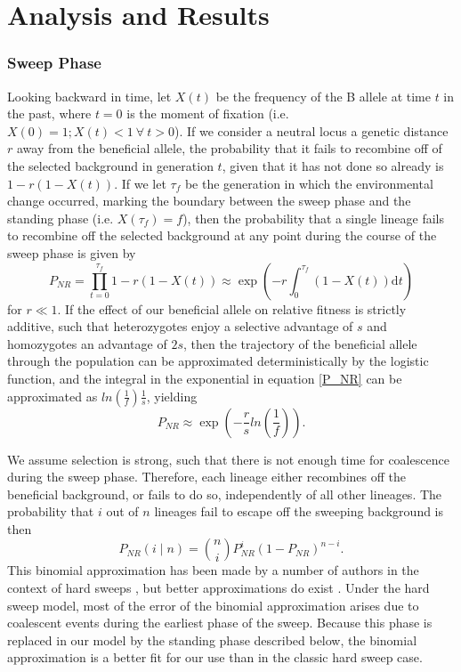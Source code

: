 \documentclass[a4paper,10pt]{article}
\begin{document}
\section*{Analysis and Results}

\subsubsection*{Sweep Phase}

Looking backward in time, let $X\left(t\right)$ be the frequency of the B allele at time $t$ in the past, where $t=0$ is the moment of fixation (i.e. $X\left(0\right) = 1; X\left(t\right) < 1\ \forall\ t > 0$). If we consider a neutral locus a genetic distance $r$ away from the beneficial allele, the probability that it fails to recombine off of the selected background in generation $t$, given that it has not done so already is $1-r\left(1-X(t)\right)$. If we let $\tau_{f}$ be the generation in which the environmental change occurred, marking the boundary between the sweep phase and the standing phase (i.e. $X\left(\tau_{f}\right) = f$), then the probability that a single lineage fails to recombine off the selected background at any point during the course of the sweep phase is given by
\begin{equation}
P_{NR} = \prod_{t=0}^{\tau_{f}} 1-r\left(1-X(t)\right)  \approx \exp \left(-r \int_0^{\tau_{f}}(1-X\left(t\right))\mathrm{d} t \right) \label{P_NR}
\end{equation}
for $r \ll 1$. If the effect of our beneficial allele on relative fitness is strictly additive, such that heterozygotes enjoy a selective advantage of $s$ and homozygotes an advantage of $2s$, then the trajectory of the beneficial allele through the population can be approximated deterministically by the logistic function, and the integral in the exponential in equation \eqref{P_NR} can be approximated as $ln\left(\frac{1}{f}\right) \frac{1}{s}$, yielding
\begin{equation}
	P_{NR} \approx \exp \left(-\frac{r}{s}ln\left(\frac{1}{f}\right)\right).
\end{equation}

We assume selection is strong, such that there is not enough time for coalescence during the sweep phase. Therefore, each lineage either recombines off the beneficial background, or fails to do so, independently of all other lineages. The probability that $i$ out of $n$ lineages fail to escape off the sweeping background is then
\begin{equation}
P_{NR}(i \mid n) = {n \choose i} P_{NR}^{i} (1-P_{NR})^{n-i}.
\end{equation}
This binomial approximation has been made by a number of authors in the context of hard sweeps \citep[e.g. ][]{Smith1974,Fay:2000us,McVean:2006ke}, but better approximations do exist \citep{Barton1998,Durrett:2004fl,Durrett:2005fr,Schweinsberg:2005eh,Etheridge:2006fk,Messer:2012ie}. Under the hard sweep model, most of the error of the binomial approximation arises due to coalescent events during the earliest phase of the sweep. Because this phase is replaced in our model by the standing phase described below, the binomial approximation is a better fit for our use than in the classic hard sweep case. 
\end{document}

